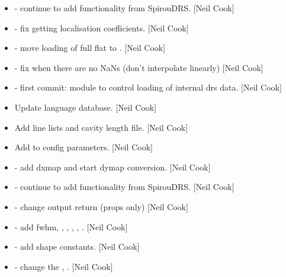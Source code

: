 \documentclass[a4paper,10pt,english]{report}
\begin{document}
\begin{itemize}
\item {} 
 - continue to add functionality from SpirouDRS.
{[}Neil Cook{]}

\item {} 
 - fix getting localisation coefficients.
{[}Neil Cook{]}

\item {} 
 - move loading of full flat to .
{[}Neil Cook{]}

\item {} 
 - fix when there are no NaNs (don’t interpolate
linearly) {[}Neil Cook{]}

\item {} 
 - first commit: module to control loading of internal drs
data. {[}Neil Cook{]}

\item {} 
Update language database. {[}Neil Cook{]}

\item {} 
Add line lists and cavity length file. {[}Neil Cook{]}

\item {} 
Add to config parameters. {[}Neil Cook{]}

\item {} 
 - add dxmap and start dymap conversion.
{[}Neil Cook{]}

\item {} 
 - continue to add functionality from SpirouDRS.
{[}Neil Cook{]}

\item {} 
 - change output return (props only) {[}Neil
Cook{]}

\item {} 
 - add fwhm, , ,
, , . {[}Neil Cook{]}

\item {} 
 - add shape constants. {[}Neil Cook{]}

\item {} 
 - change the ,
. {[}Neil Cook{]}


\end{itemize}
\end{document}
